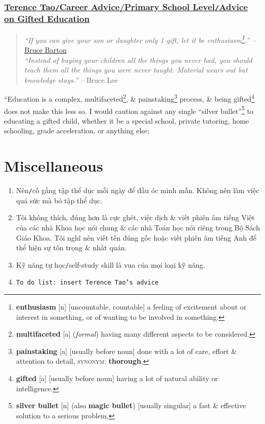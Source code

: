 \documentclass{article}
\numberwithin{equation}{section}
\begin{document}
\subsubsection{\href{https://terrytao.wordpress.com/career-advice/advice-on-gifted-education/}{Terence Tao\texttt{/}Career Advice{/}Primary School Level\texttt{/}Advice on Gifted Education}}
\begin{quotation}
	\textit{``If you can give your son or daughter only 1 gift, let it be enthusiasm\footnote{\textbf{enthusiasm} [n] [uncountable, countable] a feeling of excitement about or interest in something, or of wanting to be involved in something.}.}'' -- \href{http://en.wikipedia.org/wiki/Bruce_Fairchild_Barton}{Bruce Barton}\\
	
	\textit{``Instead of buying your children all the things you never had, you should teach them all the things you were never taught. Material wears out but knowledge stays.''} -- Bruce Lee
\end{quotation}
``Education is a complex, multifaceted\footnote{\textbf{multifaceted} [a] (\textit{formal}) having many different aspects to be considered.}, \& painstaking\footnote{\textbf{painstaking} [a] [usually before noun] done with a lot of care, effort \& attention to detail, \textsc{synonym}: \textbf{thorough}.} process, \& being gifted\footnote{\textbf{gifted} [a] [usually before noun] having a lot of natural ability or intelligence.} does not make this less so. I would caution against any single ``silver bullet''\footnote{\textbf{silver bullet} [n] (also \textbf{magic bullet}) [usually singular] a fast \& effective solution to a serious problem.} to educating a gifted child, whether it be a special school, private tutoring, home schooling, grade acceleration, or anything else; 


\section{Miscellaneous}

\begin{enumerate}
	\item Nên\texttt{/}cố gắng tập thể dục mỗi ngày để đầu óc minh mẫn. Không nên làm việc quá sức mà bỏ tập thể dục.
	\item Tôi không thích, đúng hơn là cực ghét, việc dịch \& viết phiên âm tiếng Việt của các nhà Khoa học nói chung \& các nhà Toán học nói riêng trong Bộ Sách Giáo Khoa. Tôi nghĩ nên viết tên đúng gốc hoặc viết phiên âm tiếng Anh để thể hiện sự tôn trọng \& nhất quán.
	\item Kỹ năng tự học\texttt{/}self-study skill là vua của mọi loại kỹ năng.
	\item \texttt{To do list: insert Terence Tao's advice}
\end{enumerate}


\printbibliography[heading=bibintoc]
	
\end{document}
